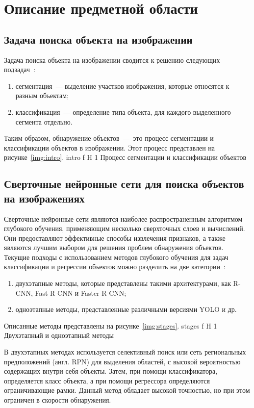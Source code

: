 \chapter{Описание предметной области}

\section{Задача поиска объекта на изображении}

Задача поиска объекта на изображении сводится к решению следующих подзадач~\cite{task}: 
\begin{enumerate}
	\item сегментация~--- выделение участков изображения, которые относятся к разным объектам;
	\item классификация~--- определение типа объекта, для каждого выделенного сегмента отдельно.
\end{enumerate}
Таким образом, обнаружение объектов~---~это процесс сегментации и классификации объектов в изображении.
Этот процесс представлен на рисунке~\ref{img:intro}.
	{intro}
	{f}
	{H}
	{1\textwidth}
	{Процесс сегментации и классификации объектов}

\section{Сверточные нейронные сети для поиска объектов на изображениях}

Сверточные нейронные сети являются наиболее распространенным алгоритмом глубокого обучения, применяющим несколько сверхточных слоев и вычислений.
Они предоставляют эффективные способы извлечения признаков, а также являются лучшим выбором для решения проблем обнаружения объектов.
Текущие подходы с использованием методов глубокого обучения для задач классификации и регрессии объектов можно разделить на две категории~\cite{base}:
\begin{enumerate}
	\item двухэтапные методы, которые представлены такими архитектурами, как R-CNN, Fast R-CNN и Faster R-CNN;
	\item одноэтапные методы, представленные различными версиями YOLO и др.
\end{enumerate}

Описанные методы представлены на рисунке~\ref{img:stages}.
	{stages}
	{f}
	{H}
	{1\textwidth}
	{Двухэтапный и одноэтапный методы}

\clearpage
В двухэтапных методах используется селективный поиск или сеть региональных предположений (англ. RPN) для выделения областей, с высокой вероятностью содержащих внутри себя объекты.
Затем, при помощи классификатора, определяется класс объекта, а при помощи регрессора определяются ограничивающие рамки.
Данный метод обладает высокой точностью, но при этом ограничен в скорости обнаружения.


